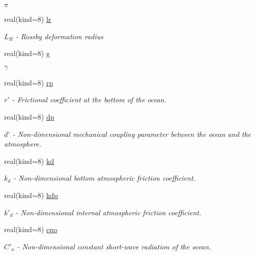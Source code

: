\begin{DoxyCompactItemize}
\begin{DoxyCompactList}\small\item\em $\pi$ \end{DoxyCompactList}\item 
real(kind=8) \hyperlink{classparams_a3082530044275cbd794604b81a7e6be0}{lr}
\begin{DoxyCompactList}\small\item\em $L_R$ -\/ Rossby deformation radius \end{DoxyCompactList}\item 
real(kind=8) \hyperlink{classparams_afb5953f2f72e02fa67d474979127e79d}{g}
\begin{DoxyCompactList}\small\item\em $\gamma$ \end{DoxyCompactList}\item 
real(kind=8) \hyperlink{classparams_ae93d91e6b6dbca141006f84d1c467921}{rp}
\begin{DoxyCompactList}\small\item\em $r'$ -\/ Frictional coefficient at the bottom of the ocean. \end{DoxyCompactList}\item 
real(kind=8) \hyperlink{classparams_aee7fb664acd19367183ac09fdfe5ebe0}{dp}
\begin{DoxyCompactList}\small\item\em $d'$ -\/ Non-\/dimensional mechanical coupling parameter between the ocean and the atmosphere. \end{DoxyCompactList}\item 
real(kind=8) \hyperlink{classparams_ae9bae2195091caeb7918dcbc3e57f109}{kd}
\begin{DoxyCompactList}\small\item\em $k_d$ -\/ Non-\/dimensional bottom atmospheric friction coefficient. \end{DoxyCompactList}\item 
real(kind=8) \hyperlink{classparams_a764d9607a4fdabf5e51f36e90fd7e568}{kdp}
\begin{DoxyCompactList}\small\item\em $k'_d$ -\/ Non-\/dimensional internal atmospheric friction coefficient. \end{DoxyCompactList}\item 
real(kind=8) \hyperlink{classparams_a89b8bfb0d5a9275b0301c8ebe1a92da7}{cpo}
\begin{DoxyCompactList}\small\item\em $C'_a$ -\/ Non-\/dimensional constant short-\/wave radiation of the ocean. \end{DoxyCompactList}\item 

\end{DoxyCompactItemize}

